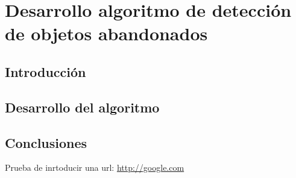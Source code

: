 
\chapter{Desarrollo algoritmo de detección de objetos abandonados}
\label{cha:desarrollo}

\section{Introducción}
\label{sec:intro-alg-abandono}

\section{Desarrollo del algoritmo}
\label{sec:alg-abandono}

\section{Conclusiones}
\label{sec:conclu-alg-abandono}

Prueba de inrtoducir una url: \url{http://google.com}
